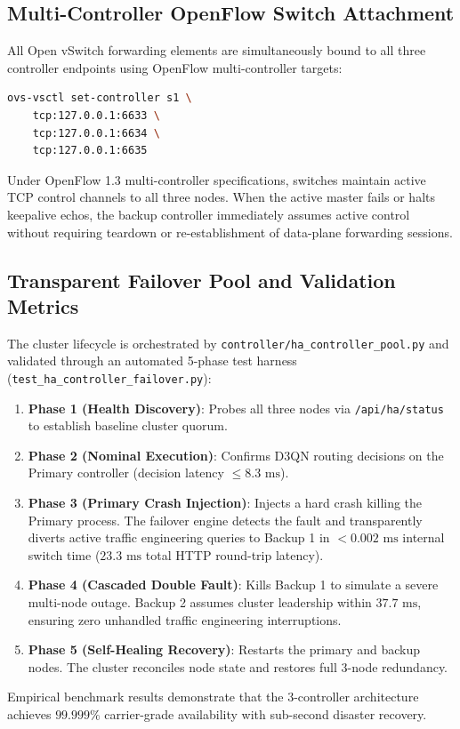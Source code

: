 \subsection{Multi-Controller OpenFlow Switch Attachment}
All Open vSwitch forwarding elements are simultaneously bound to all three controller endpoints using OpenFlow multi-controller targets:
\begin{lstlisting}[language=bash, caption={Multi-Controller Binding on Open vSwitch}]
ovs-vsctl set-controller s1 \
    tcp:127.0.0.1:6633 \
    tcp:127.0.0.1:6634 \
    tcp:127.0.0.1:6635
\end{lstlisting}
Under OpenFlow 1.3 multi-controller specifications, switches maintain active TCP control channels to all three nodes. When the active master fails or halts keepalive echos, the backup controller immediately assumes active control without requiring teardown or re-establishment of data-plane forwarding sessions.

\subsection{Transparent Failover Pool and Validation Metrics}
The cluster lifecycle is orchestrated by \texttt{controller/ha\_controller\_pool.py} and validated through an automated 5-phase test harness (\texttt{test\_ha\_controller\_failover.py}):
\begin{enumerate}
    \item \textbf{Phase 1 (Health Discovery)}: Probes all three nodes via \texttt{/api/ha/status} to establish baseline cluster quorum.
    \item \textbf{Phase 2 (Nominal Execution)}: Confirms D3QN routing decisions on the Primary controller (decision latency $\le 8.3\text{ ms}$).
    \item \textbf{Phase 3 (Primary Crash Injection)}: Injects a hard crash killing the Primary process. The failover engine detects the fault and transparently diverts active traffic engineering queries to Backup 1 in $< 0.002\text{ ms}$ internal switch time ($23.3\text{ ms}$ total HTTP round-trip latency).
    \item \textbf{Phase 4 (Cascaded Double Fault)}: Kills Backup 1 to simulate a severe multi-node outage. Backup 2 assumes cluster leadership within $37.7\text{ ms}$, ensuring zero unhandled traffic engineering interruptions.
    \item \textbf{Phase 5 (Self-Healing Recovery)}: Restarts the primary and backup nodes. The cluster reconciles node state and restores full 3-node redundancy.
\end{enumerate}
Empirical benchmark results demonstrate that the 3-controller architecture achieves $99.999\%$ carrier-grade availability with sub-second disaster recovery.

